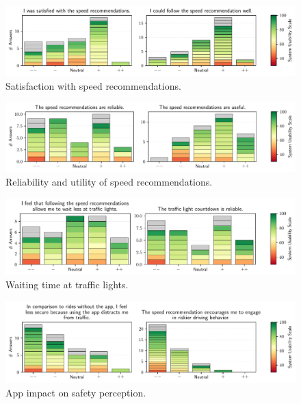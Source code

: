 \begin{figure}[t]
\caption{Satisfaction with speed recommendations.}\label{fig:speed-recommendations-satisfaction}
\includegraphics[width=\linewidth]{images/app-usability-questions-speed-recommendations-satisfaction.pdf}
\end{figure}
          

\begin{figure}[t]
\caption{Reliability and utility of speed recommendations.}\label{fig:speed-recommendations-reliability}
\includegraphics[width=\linewidth]{images/app-usability-questions-speed-recommendations-reliability.pdf}
\end{figure}
          

\begin{figure}[t]
\caption{Waiting time at traffic lights.}\label{fig:waiting-time-at-traffic-lights}
\includegraphics[width=\linewidth]{images/app-usability-questions-waiting-time-at-traffic-lights.pdf}
\end{figure}
          

\begin{figure}[t]
\caption{App impact on safety perception.}\label{fig:app-impact-on-safety}
\includegraphics[width=\linewidth]{images/app-usability-questions-app-impact-on-safety.pdf}
\end{figure}
          

